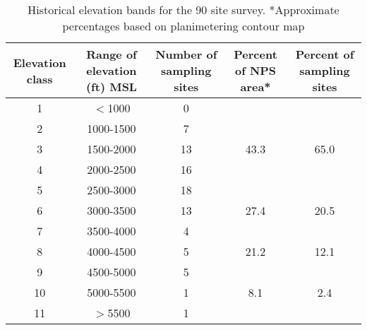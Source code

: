 \begin{table}[htbp]
\centering
\begin{tabular}{ccccc}
\toprule
Elevation class & \multicolumn{1}{p{3cm}}{Range of elevation (ft) MSL} & \multicolumn{1}{p{3cm}}{Number of sampling sites} & \multicolumn{1}{p{2cm}}{Percent of NPS area*} & \multicolumn{1}{p{2cm}}{Percent of sampling sites} \\ 
\midrule
1 & $<$1000 & 0 &  & \\ 
2 & 1000-1500 & 7 & &  \\ 
3 & 1500-2000 & 13 &43.3 &65.0  \\ 
4 & 2000-2500 & 16 &  &  \\ 
5 & 2500-3000 & 18 & &  \\ \midrule
6 & 3000-3500 & 13 & 27.4 & 20.5 \\ 
7 & 3500-4000 & 4 & & \\ \midrule
8 & 4000-4500 & 5 & 21.2 & 12.1 \\ 
9 & 4500-5000 & 5 & &  \\ \midrule
10 & 5000-5500 & 1 &8.1 & 2.4 \\ 
11 & $>$5500 & 1 & &  \\ 
\bottomrule
\end{tabular}
\caption[Historical elevation bands for the 90 site survey.]{Historical elevation bands for the 90 site survey. *Approximate percentages based on planimetering contour map}
\label{tab:Odomtable}
\end{table}
